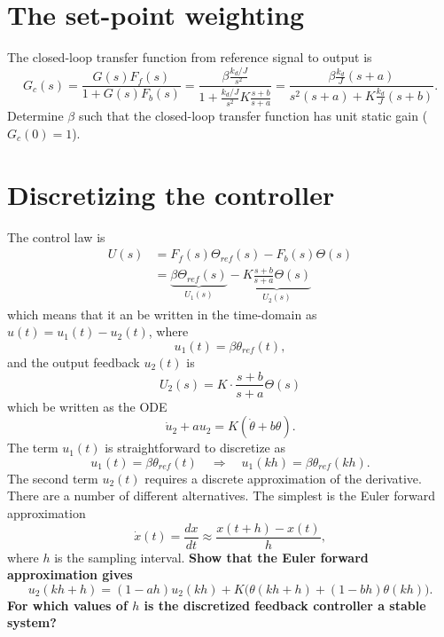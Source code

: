 \documentclass[a4paper]{scrartcl}
\begin{document}
\section*{The set-point weighting}
\label{sec-7}
The closed-loop transfer function from reference signal to output is 
\[ G_c(s) = \frac{G(s)F_f(s)}{1 + G(s)F_b(s)} = \frac{\beta \frac{k_d/J}{s^2}}{ 1 + \frac{k_d/J}{s^2} K \frac{s+b}{s+a}} = \frac{\beta \frac{k_d}{J} (s+a)}{s^2(s+a) + K\frac{k_d}{J}(s+b)}.\]
Determine $\beta$ such that the closed-loop transfer function has unit static gain (\(G_c(0)=1\)).

\section*{Discretizing the controller}
\label{sec-8}
The control law is 
\begin{align*} 
U(s) &= F_f(s)\Theta_{ref}(s) - F_b(s)\Theta(s)\\
 &= \underbrace{\beta\Theta_{ref}(s)}_{U_1(s)} - \underbrace{K\frac{s + b}{s+a} \Theta(s)}_{U_2(s)}
\end{align*}
which means that it an be written in the time-domain as \(u(t) = u_1(t) - u_2(t)\), where
\begin{equation}
  u_1(t) = \beta \theta_{ref}(t),
\end{equation}
and the output feedback $u_2(t)$ is 
\[U_2(s) = K \cdot \frac{s + b}{s + a} \Theta(s)\]
which be written as the ODE 
$$\dot{u}_2 + a u_2 =  K (\dot{\theta} + b \theta).$$
The term \(u_1(t)\) is straightforward to discretize as
$$ u_1(t) = \beta \theta_{ref}(t) \quad \Rightarrow \quad u_1(kh) = \beta \theta_{ref}(kh). $$
The second term $u_2(t)$ requires a discrete approximation of the derivative. There are a number of different alternatives. The simplest is the Euler forward approximation
$$ \dot{x}(t) = \frac{dx}{dt} \approx \frac{x(t+h) - x(t)}{h}, $$
where $h$ is the sampling interval. 
\textbf{Show that the Euler forward approximation gives} 
$$ u_2(kh+h) = ( 1 - ah) u_2(kh) + K \Big(\theta(kh+h) + (1-bh)\theta(kh)\Big). $$
\textbf{For which values of $h$ is the discretized feedback controller a stable system?}
\end{document}
